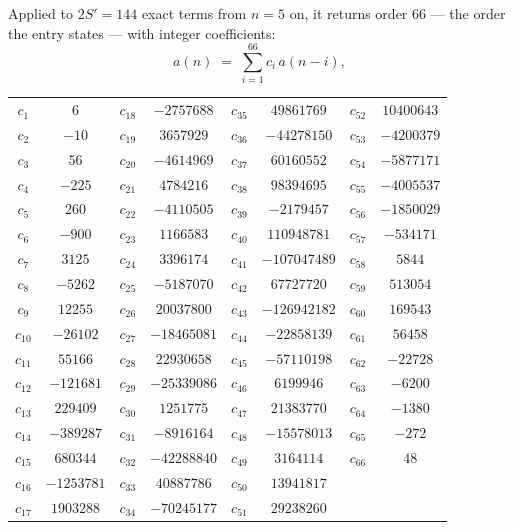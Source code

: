 \documentclass[11pt,a4paper]{article}
\theoremstyle{plain}
\theoremstyle{definition}
\begin{document}
Applied to $2S'=144$ exact terms from $n=5$ on, it returns order $66$ --- the
order the entry states --- with integer coefficients:
\[
a(n)\;=\;\sum_{i=1}^{66}c_i\,a(n-i),
\]
\begin{center}\small
\begin{tabular}{cccccccc}
$c_{1}$ & $6$ & $c_{18}$ & $-2757688$ & $c_{35}$ & $49861769$ & $c_{52}$ & $10400643$ \\
$c_{2}$ & $-10$ & $c_{19}$ & $3657929$ & $c_{36}$ & $-44278150$ & $c_{53}$ & $-4200379$ \\
$c_{3}$ & $56$ & $c_{20}$ & $-4614969$ & $c_{37}$ & $60160552$ & $c_{54}$ & $-5877171$ \\
$c_{4}$ & $-225$ & $c_{21}$ & $4784216$ & $c_{38}$ & $98394695$ & $c_{55}$ & $-4005537$ \\
$c_{5}$ & $260$ & $c_{22}$ & $-4110505$ & $c_{39}$ & $-2179457$ & $c_{56}$ & $-1850029$ \\
$c_{6}$ & $-900$ & $c_{23}$ & $1166583$ & $c_{40}$ & $110948781$ & $c_{57}$ & $-534171$ \\
$c_{7}$ & $3125$ & $c_{24}$ & $3396174$ & $c_{41}$ & $-107047489$ & $c_{58}$ & $5844$ \\
$c_{8}$ & $-5262$ & $c_{25}$ & $-5187070$ & $c_{42}$ & $67727720$ & $c_{59}$ & $513054$ \\
$c_{9}$ & $12255$ & $c_{26}$ & $20037800$ & $c_{43}$ & $-126942182$ & $c_{60}$ & $169543$ \\
$c_{10}$ & $-26102$ & $c_{27}$ & $-18465081$ & $c_{44}$ & $-22858139$ & $c_{61}$ & $56458$ \\
$c_{11}$ & $55166$ & $c_{28}$ & $22930658$ & $c_{45}$ & $-57110198$ & $c_{62}$ & $-22728$ \\
$c_{12}$ & $-121681$ & $c_{29}$ & $-25339086$ & $c_{46}$ & $6199946$ & $c_{63}$ & $-6200$ \\
$c_{13}$ & $229409$ & $c_{30}$ & $1251775$ & $c_{47}$ & $21383770$ & $c_{64}$ & $-1380$ \\
$c_{14}$ & $-389287$ & $c_{31}$ & $-8916164$ & $c_{48}$ & $-15578013$ & $c_{65}$ & $-272$ \\
$c_{15}$ & $680344$ & $c_{32}$ & $-42288840$ & $c_{49}$ & $3164114$ & $c_{66}$ & $48$ \\
$c_{16}$ & $-1253781$ & $c_{33}$ & $40887786$ & $c_{50}$ & $13941817$ &  &  \\
$c_{17}$ & $1903288$ & $c_{34}$ & $-70245177$ & $c_{51}$ & $29238260$ &  &  \\
\end{tabular}
\end{center}
\end{document}

